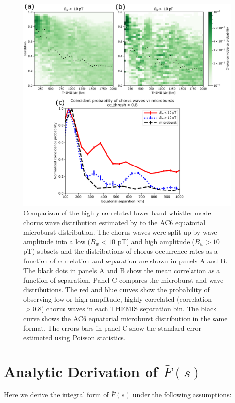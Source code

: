 \documentclass[draft]{agujournal2019}
\begin{document}
\begin{figure}
\includegraphics[width=\textwidth]{appendix_a.pdf}
\caption{Comparison of the highly correlated lower band whistler mode chorus wave distribution estimated by  to the AC6 equatorial microburst distribution. The chorus waves were split up by wave amplitude into a low ($B_w < 10$ pT) and high amplitude ($B_w > 10$ pT) subsets and the distributions of chorus occurrence rates as a function of correlation and separation are shown in panels A and B. The black dots in panels A and B show the mean correlation as a function of separation. Panel C compares the microburst and wave distributions. The red and blue curves show the probability of observing low or high amplitude, highly correlated (correlation $> 0.8$) chorus waves in each THEMIS separation bin. The black curve shows the AC6 equatorial microburst distribution in the same format. The errors bars in panel C show the standard error estimated using Poisson statistics.}
\label{fig_appendixa_1}
\end{figure}

\section{Analytic Derivation of $\bar{F}(s)$} \label{appendixb}
Here we derive the integral form of $\bar{F}(s)$ under the following assumptions:
\end{document}
